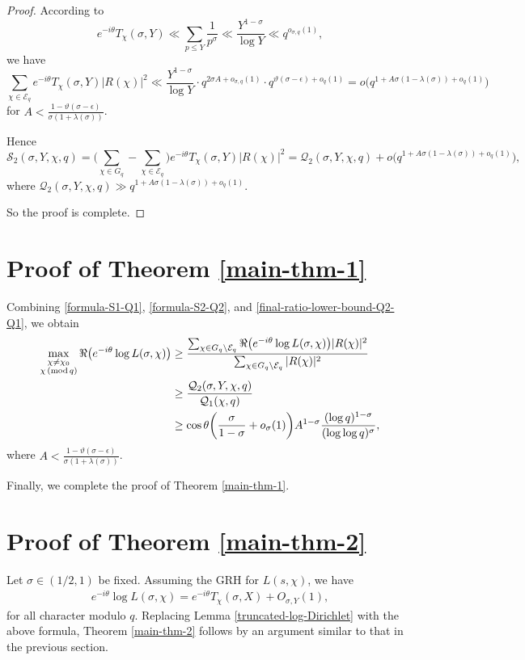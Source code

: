 \documentclass[12pt]{amsart}
\numberwithin{equation}{section}
\theoremstyle{plain}
\theoremstyle{remark}
\theoremstyle{definition}
\theoremstyle{remark}
\renewcommand{\mod}[1]{\,({\rm mod}\,#1)}
\begin{document}
\begin{proof}
According to
\[
e^{-i\theta}T_{\chi}(\sigma,Y)\ll\sum_{p\leq Y}\frac{1}{p^{\sigma}}\ll \frac{Y^{1-\sigma}}{\log Y}\ll q^{o_{\sigma,q}(1)},
\]
we have
\[
\sum_{\chi\in \mathcal{E}_q}e^{-i\theta}T_{\chi}(\sigma,Y)|R(\chi)|^2
\ll \frac{Y^{1-\sigma}}{\log Y}\cdot q^{2\sigma A+o_{\sigma,q}(1)}\cdot q^{\vartheta(\sigma-\epsilon)+o_{q}(1)}
=o\big(q^{1+A\sigma(1-\lambda(\sigma))+o_q(1)}\big)
\]
for $A<\frac{1-\vartheta(\sigma-\epsilon)}{\sigma(1+\lambda(\sigma))}$.

Hence
\[
\mathcal{S}_2(\sigma,Y,\chi,q)=\bigg(\sum_{\chi\in G_q}-\sum_{\chi\in\mathcal{E}_q}\bigg)e^{-i\theta}T_{\chi}(\sigma,Y)|R(\chi)|^2
=\mathcal{Q}_2(\sigma,Y,\chi,q)+o\big(q^{1+A\sigma(1-\lambda(\sigma))+o_q(1)}\big),
\]
where $\mathcal{Q}_2(\sigma,Y,\chi,q)\gg q^{1+A\sigma(1-\lambda(\sigma))+o_q(1)}$.

So the proof is complete.

\end{proof}



\section{Proof of Theorem \ref{main-thm-1}}
Combining \eqref{formula-S1-Q1}, \eqref{formula-S2-Q2}, and \eqref{final-ratio-lower-bound-Q2-Q1}, we obtain
\begin{equation}\label{final-proof-thm1}
\begin{aligned}
\max_{\substack{\chi\neq\chi_0\\ \chi\mod q}}\Re\big(e^{-i\theta}\log L(\sigma,\chi)\big)
&\geq
\frac
{
\sum_{\chi\in G_q\setminus \mathcal{E}_q}\Re\big(e^{-i\theta}\log L(\sigma,\chi)\big)|R(\chi)|^2
}
{
\sum_{\chi\in G_q\setminus \mathcal{E}_q}|R(\chi)|^2
}\\
&\geq\frac{\mathcal{Q}_2(\sigma,Y,\chi,q)}{\mathcal{Q}_1(\chi,q)}\\
&\geq\cos\theta\bigg(\frac{\sigma}{1-\sigma}+o_{\sigma}(1)\bigg)
A^{1-\sigma}\frac{(\log q)^{1-\sigma}}{(\log\log q)^{\sigma}},
\end{aligned}
\end{equation}
where $A<\frac{1-\vartheta(\sigma-\epsilon)}{\sigma(1+\lambda(\sigma))}$.

Finally, we complete the proof of Theorem \ref{main-thm-1}.


\section{Proof of Theorem \ref{main-thm-2}}
Let $\sigma\in(1/2,1)$ be fixed. Assuming the GRH for $L(s,\chi)$, we have
\begin{equation*}
\begin{aligned}
e^{-i\theta}\log L(\sigma,\chi)=e^{-i\theta}T_{\chi}(\sigma,X)+O_{\sigma,Y}(1),
\end{aligned}
\end{equation*}
for all character modulo $q$. Replacing Lemma \ref{truncated-log-Dirichlet} with the above formula,
Theorem \ref{main-thm-2} follows by an argument similar to that in the previous section.
\end{document}
